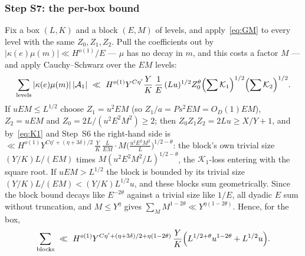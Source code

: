 \documentclass[11pt,a4paper]{article}
\begin{document}
\subsubsection*{Step S7: the per-box bound}
Fix a box $(L,K)$ and a block $(E,M)$ of levels, and apply~\eqref{eq:GM} to every level with the same $Z_0,Z_1,Z_2$. Pull the coefficients out by $|\kappa(e)\mu(m)|\ll H^{o(1)}/E$
--- $\mu$ has no decay in $m$, and this costs a factor $M$ --- and apply Cauchy--Schwarz over the $EM$ levels:
\[
\sum_{\text{levels}}|\kappa(e)\mu(m)|\,|\mathcal A_1|\ \ll\ H^{o(1)}Y^{C\eta'}\frac YK\,\frac1E\,(Lu)^{1/2}Z_0^{\theta}\Bigl(\sum\mathcal K_1\Bigr)^{1/2}\Bigl(\sum\mathcal K_2\Bigr)^{1/2}.
\]
If $uEM\le L^{1/2}$ choose $Z_1=u^2EM$ (so $Z_1/a=Ps^2EM=O_D(1)EM$), $Z_2=uEM$ and $Z_0=2L/(u^2E^2M^2)\ge2$; then $Z_0Z_1Z_2=2Lu\ge X/Y+1$, and by~\eqref{eq:K1} and Step~S6 the
right-hand side is $\ll H^{o(1)}Y^{C\eta'+(\eta+3\delta)/2}\,\frac YK\,\frac{L}{EM}\cdot M\bigl(\frac{u^2E^2M^2}L\bigr)^{1/2-\theta}$: the block's own trivial size $(Y/K)L/(EM)$ times
$M(u^2E^2M^2/L)^{1/2-\theta}$, the $\mathcal K_1$-loss entering with the square root. If $uEM>L^{1/2}$ the block is bounded by its trivial size $(Y/K)L/(EM)<(Y/K)L^{1/2}u$, and these
blocks sum geometrically. Since the block bound decays like $E^{-2\theta}$ against a trivial size like $1/E$, all dyadic $E$ sum without truncation, and $M\le Y^{\eta}$ gives
$\sum_MM^{1-2\theta}\ll Y^{\eta(1-2\theta)}$. Hence, for the box,
\[
\sum_{\text{blocks}}\ \ll\ H^{o(1)}Y^{C\eta'+(\eta+3\delta)/2+\eta(1-2\theta)}\,\frac YK\Bigl(L^{1/2+\theta}u^{1-2\theta}+L^{1/2}u\Bigr).
\]
\end{document}
